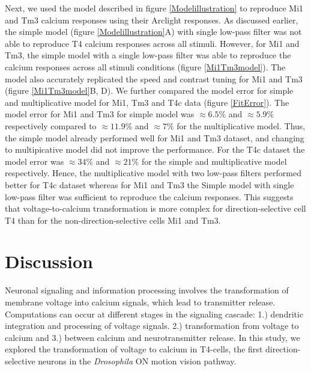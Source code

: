 \documentclass[9pt,lineno]{elife}
\begin{document}
Next, we used the model described in figure \ref{Modelillustration} to reproduce Mi1 and Tm3 calcium responses using their Arclight responses. As discussed earlier, the simple model (figure \ref{Modelillustration}A) with single low-pass filter was not able to reproduce T4 calcium responses across all stimuli. However, for Mi1 and Tm3, the simple model with a single low-pass filter was able to reproduce the calcium responses across all stimuli conditions (figure \ref{Mi1Tm3model}). The model also accurately replicated the speed and contrast tuning for Mi1 and Tm3 (figure \ref{Mi1Tm3model}B, D). We further compared the model error for simple and multiplicative model for Mi1, Tm3 and T4c data (figure \ref{FitError}). The model error for Mi1 and Tm3 for simple model was $\approx6.5\%$ and $\approx5.9\%$ respectively compared to $\approx11.9\%$ and $\approx7\%$ for the multiplicative model. Thus, the simple model already performed well for Mi1 and Tm3 dataset, and changing to multipicative model did not improve the performance. For the T4c dataset the model error was $\approx34\%$ and  $\approx21\%$ for the simple and multiplicative model respectively. Hence, the multiplicative model with two low-pass filters performed better for T4c dataset whereas for Mi1 and Tm3 the Simple model with single low-pass filter was sufficient to reproduce the calcium responses. This suggests that voltage-to-calcium transformation is more complex for direction-selective cell T4 than for the non-direction-selective cells Mi1 and Tm3.

\section{Discussion}
Neuronal signaling and information processing involves the transformation of membrane voltage into calcium signals, which lead to transmitter release. Computations can occur at different stages in the signaling cascade: 1.) dendritic integration and processing of voltage signals. 2.) transformation from voltage to calcium and 3.) between calcium and neurotransmitter release. In this study, we explored the transformation of voltage to calcium in T4-cells, the first direction-selective neurons in the \textit{Drosophila} ON motion vision pathway. %
\end{document}
